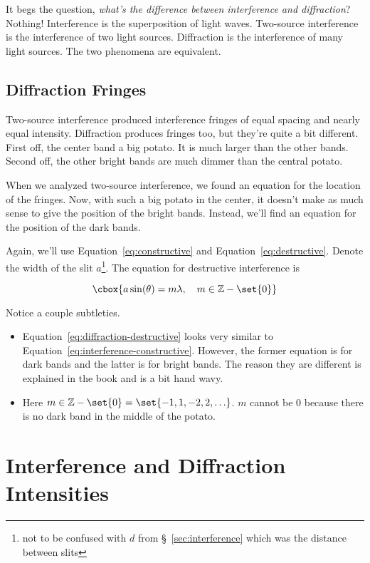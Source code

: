 \documentclass{hw}
\numberwithin{equation}{section}
\begin{document}
It begs the question, \emph{what's the difference between interference and
diffraction}? Nothing! Interference is the superposition of light waves.
Two-source interference is the interference of two light sources. Diffraction
is the interference of many light sources. The two phenomena are equivalent.  

\subsection{Diffraction Fringes}
Two-source interference produced interference fringes of equal spacing and
nearly equal intensity. Diffraction produces fringes too, but they're quite a
bit different. First off, the center band a big potato. It is much larger than
the other bands. Second off, the other bright bands are much dimmer than the
central potato. 

When we analyzed two-source interference, we found an equation for the location
of the fringes. Now, with such a big potato in the center, it doesn't make as
much sense to give the position of the bright bands. Instead, we'll find an
equation for the position of the dark bands.

Again, we'll use Equation~\ref{eq:constructive} and
Equation~\ref{eq:destructive}. Denote the width of the slit $a$\footnote{not to
be confused with $d$ from \S~\ref{sec:interference} which was the distance
between slits}. The equation for destructive interference is

\begin{equation}\label{eq:diffraction-destructive}
  \cbox{a \sin(\theta) = m \lambda, \quad m \in \mathbb{Z} - \set{0}}
\end{equation}

Notice a couple subtleties.
\begin{itemize}
  \item Equation~\ref{eq:diffraction-destructive} looks very similar to
    Equation~\ref{eq:interference-constructive}. However, the former equation
    is for dark bands and the latter is for bright bands. The reason they are
    different is explained in the book and is a bit hand wavy.
  \item Here $m \in \mathbb{Z} - \set{0} = \set{-1, 1, -2, 2, \ldots}$. $m$
    cannot be $0$ because there is no dark band in the middle of the potato.
\end{itemize}

\section{Interference and Diffraction Intensities}

\end{document}

